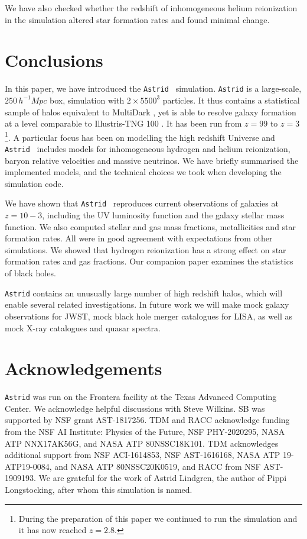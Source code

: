 \documentclass[fleqn,usenatbib]{mnras}
\newcommand{\mpch}{\,h^{-1}\unit{Mpc}}
\def\astrid{\texttt{Astrid} }
\begin{document}
We have also checked whether the redshift of inhomogeneous helium reionization in the simulation altered star formation rates and found minimal change. 

\section{Conclusions}

In this paper, we have introduced the \astrid~simulation. \astrid is a large-scale, $250 \mpch$ box, simulation with $2\times 5500^3$ particles. It thus contains a statistical sample of halos equivalent to  MultiDark \citep{2016MNRAS.457.4340K}, yet is able to resolve galaxy formation at a level comparable to Illustris-TNG 100 \citep{2018MNRAS.475..648P}. It has been run from $z=99$ to $z=3$\footnote{During the preparation of this paper we continued to run the simulation and it has now reached $z=2.8$.}. A particular focus has been on modelling the high redshift Universe and \astrid~includes models for inhomogeneous hydrogen and helium reionization, baryon relative velocities and massive neutrinos. We have briefly summarised the implemented models, and the technical choices we took when developing the simulation code.

We have shown that \astrid~reproduces current observations of galaxies at $z=10-3$, including the UV luminosity function and the galaxy stellar mass function. We also computed stellar and gas mass fractions, metallicities and star formation rates. All were in good agreement with expectations from other simulations. We showed that hydrogen reionization has a strong effect on star formation rates and gas fractions. Our companion paper \citep{Ni:2021inprep} examines the statistics of black holes. 

\astrid contains an unusually large number of high redshift halos, which will enable several related investigations. In future work we will make mock galaxy observations for JWST, mock black hole merger catalogues for LISA, as well as mock X-ray catalogues and quasar spectra.

\section*{Acknowledgements}

\astrid was run on the Frontera facility at the Texas Advanced Computing Center.
We acknowledge helpful discussions with Steve Wilkins. 
SB was supported by NSF grant AST-1817256. 
TDM and RACC acknowledge funding from 
the NSF AI Institute: Physics of the Future, NSF PHY-2020295, 
NASA ATP NNX17AK56G, and NASA ATP 80NSSC18K101. TDM acknowledges additional support from  NSF ACI-1614853, NSF AST-1616168, NASA ATP 19-ATP19-0084, 
  and NASA ATP 80NSSC20K0519, and RACC from NSF AST-1909193.
We are grateful for the work of Astrid Lindgren, the author of Pippi Longstocking, after whom this simulation is named.
\end{document}
